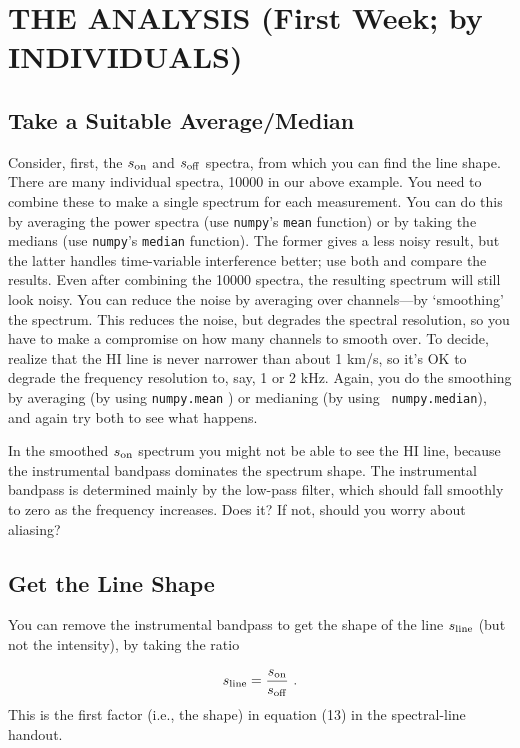 \documentclass[12pt,preprint]{aastex}
\begin{document}
\section{THE ANALYSIS (First Week; by INDIVIDUALS)} \label{analysis}

\subsection{Take a Suitable Average/Median}
Consider, first, the $s_{\rm on}$ and $s_{\rm off}$ spectra, from which
you can find the line shape. There are many individual spectra, 10000 in
our above example. You need to combine these to make a single spectrum
for each measurement. You can do this by averaging the power spectra
(use {\tt numpy}'s {\tt mean} function) or by taking the medians (use {\tt numpy}'s
{\tt median} function). The former gives a less noisy result, but the
latter handles time-variable interference better; use both and compare
the results. Even after combining the 10000 spectra, the resulting
spectrum will still look noisy.  You can reduce the noise by averaging
over channels---by `smoothing' the spectrum. This reduces the noise, but
degrades the spectral resolution, so you have to make a compromise on
how many channels to smooth over. To decide, realize that the HI line is
never narrower than about 1 km/s, so it's OK to degrade the frequency
resolution to, say, 1 or 2 kHz. Again, you do the smoothing by averaging
(by using {\tt numpy.mean} ) or medianing (by using {\tt
  numpy.median}), and again try both to see what happens.

In the smoothed $s_{\rm on}$ spectrum you might not be able to see the
HI line, because the instrumental bandpass dominates the spectrum
shape. The instrumental bandpass is determined mainly by the low-pass
filter, which should fall smoothly to zero as the frequency
increases. Does it? If not, should you worry about aliasing?

\subsection{Get the Line Shape}

You can remove the instrumental bandpass to get the shape
of the line $s_{\rm line}$ (but not the intensity), by taking the ratio 

\begin{equation}
s_{\rm line} = \frac{s_{\rm on}}{s_{\rm off}} \ .
\end{equation}
%
This is the first factor (i.e., the shape) in equation
(13) in the spectral-line handout.
%
\end{document}

